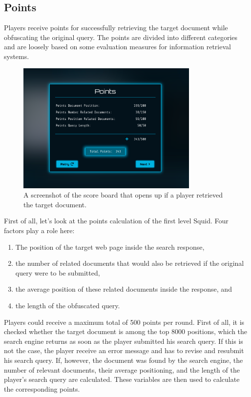 \subsection*{Points}
Players receive points for successfully retrieving the target document while obfuscating the original query. The points are divided into different categories and are loosely based on some evaluation measures for information retrieval systems.
\begin{figure}[h]
\centering
    \includegraphics[width=0.8\textwidth]{graphics/game/points_cropped.pdf}
    \caption{A screenshot of the score board that opens up if a player retrieved the target document.}
    \label{fig:points}
\end{figure}
First of all, let's look at the points calculation of the first level Squid.
\newpage
\noindent Four factors play a role here:
\begin{enumerate}
    \item The position of the target web page inside the search response,
    \item the number of related documents that would also be retrieved if the original query were to be submitted,
    \item the average position of these related documents inside the response, and
    \item the length of the obfuscated query.
\end{enumerate}
Players could receive a maximum total of 500 points per round. First of all, it is checked whether the target document is among the top 8000 positions, which the search engine returns as soon as the player submitted his search query. If this is not the case, the player receive an error message and has to revise and resubmit his search query. If, however, the document was found by the search engine, the number of relevant documents, their average positioning, and the length of the player's search query are calculated. These variables are then used to calculate the corresponding points.\par
